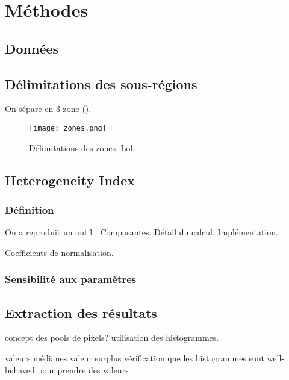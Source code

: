 
\chapter{Méthodes}

\section{Données}

\section{Délimitations des sous-régions}

On sépare en 3 zone ().

\begin{figure}
  \texttt{[image: zones.png]}
  \caption{Délimitations des zones. Lol.}
  \label{fig:zone-delimitation}
\end{figure}

\section{Heterogeneity Index}
\subsection{Définition}

On a reproduit un outil \parencite{liu_2016}.
Composantes.
Détail du calcul.
Implémentation.

Coefficients de normalisation.

\subsection{Sensibilité aux paramètres}

\section{Extraction des résultats}

concept des pools de pixels?
utilisation des histogrammes.

valeurs médianes
valeur surplus
vérification que les histogrammes sont well-behaved pour prendre des valeurs

